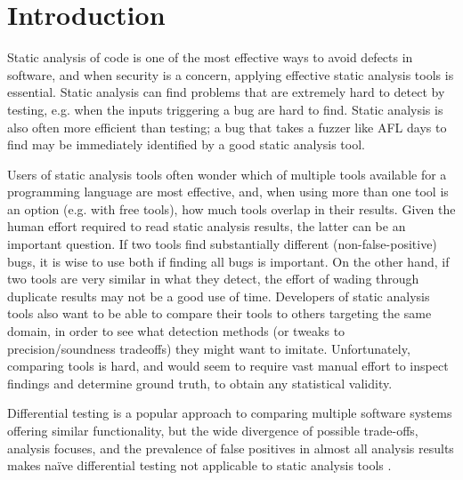 \section{Introduction}

Static analysis of code is one of the most effective ways to avoid defects in software, and when security is a concern, applying effective static analysis tools is essential.  Static analysis can find problems that are extremely hard to detect by testing, e.g. when the inputs triggering a bug are hard to find.  Static analysis is also often more efficient than testing; a bug that takes a fuzzer like AFL days to find may be immediately identified by a good static analysis tool.

Users of static analysis tools often wonder which of multiple tools available for a programming language are most effective, and, when using more than one tool is an option (e.g. with free tools), how much tools overlap in their results.  Given the human effort required to read static analysis results, the latter can be an important question.  If two tools find substantially different (non-false-positive) bugs, it is wise to use both if finding all bugs is important.  On the other hand, if two tools are very similar in what they detect, the effort of wading through duplicate results may not be a good use of time.  Developers of static analysis tools also want to be able to compare their tools to others targeting the same domain, in order to see what detection methods (or tweaks to precision/soundness tradeoffs) they might want to imitate.  Unfortunately, comparing tools is hard, and would seem to require vast manual effort to inspect findings and determine ground truth, to obtain any statistical validity.

Differential testing \cite{McKeeman,ICSEDiff} is a popular approach to comparing multiple software systems offering similar functionality, but the wide divergence of possible trade-offs, analysis focuses, and the prevalence of false positives in almost all analysis results makes na\"ive differential testing not applicable to static analysis tools \cite{regehrRandom}.

